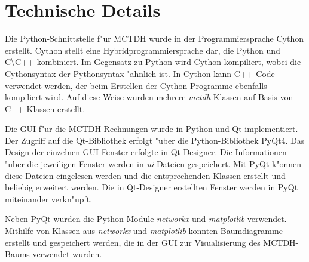 \chapter{Technische Details}
\label{cha:Tech}

Die Python-Schnittstelle f"ur MCTDH wurde in der Programmiersprache Cython erstellt. 
Cython stellt eine Hybridprogrammiersprache dar,
die Python und C\textbackslash C++ kombiniert. Im Gegensatz zu Python
wird Cython kompiliert, wobei die Cythonsyntax der Pythonsyntax "ahnlich ist.
In Cython kann C++ Code verwendet werden, der beim Erstellen der Cython-Programme ebenfalls kompiliert wird.
Auf diese Weise wurden mehrere \textit{mctdh}-Klassen auf Basis von C++ Klassen erstellt.

Die GUI f"ur die MCTDH-Rechnungen wurde in Python und Qt implementiert.
Der Zugriff auf die Qt-Bibliothek erfolgt "uber die Python-Bibliothek PyQt4. 
Das Design der einzelnen GUI-Fenster erfolgte in Qt-Designer. Die Informationen "uber 
die jeweiligen Fenster werden in \textit{ui}-Dateien gespeichert. Mit PyQt k"onnen diese Dateien eingelesen werden und die entsprechenden 
Klassen erstellt und beliebig erweitert werden.
Die in Qt-Designer erstellten Fenster werden in PyQt miteinander verkn"upft.

Neben PyQt wurden die Python-Module \textit{networkx} und \textit{matplotlib} verwendet.
Mithilfe von Klassen aus \textit{networkx} und \textit{matplotlib} konnten Baumdiagramme erstellt und gespei\-chert werden, die in der GUI zur 
Visualisierung des MCTDH-Baums verwendet wurden.

  




   
